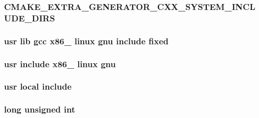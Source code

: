 \subsubsection[{\texorpdfstring{C\+M\+A\+K\+E\+\_\+\+E\+X\+T\+R\+A\+\_\+\+G\+E\+N\+E\+R\+A\+T\+O\+R\+\_\+\+C\+X\+X\+\_\+\+S\+Y\+S\+T\+E\+M\+\_\+\+I\+N\+C\+L\+U\+D\+E\+\_\+\+D\+I\+RS}{CMAKE_EXTRA_GENERATOR_CXX_SYSTEM_INCLUDE_DIRS}}]{ C\+M\+A\+K\+E\+\_\+\+E\+X\+T\+R\+A\+\_\+\+G\+E\+N\+E\+R\+A\+T\+O\+R\+\_\+\+C\+X\+X\+\_\+\+S\+Y\+S\+T\+E\+M\+\_\+\+I\+N\+C\+L\+U\+D\+E\+\_\+\+D\+I\+RS}\hypertarget{CMakeCache_8txt_ae84758144b16fbed96a3e6ea5781d3ad}{}\label{CMakeCache_8txt_ae84758144b16fbed96a3e6ea5781d3ad}
\subsubsection[{\texorpdfstring{fixed}{fixed}}]{\setlength{\rightskip}{0pt plus 5cm}usr lib gcc x86\+\_ linux {\bf gnu} {\bf include} fixed}\hypertarget{CMakeCache_8txt_a4a461500e9bc62f37d07d326b178ef08}{}\label{CMakeCache_8txt_a4a461500e9bc62f37d07d326b178ef08}
\subsubsection[{\texorpdfstring{gnu}{gnu}}]{\setlength{\rightskip}{0pt plus 5cm}usr {\bf include} x86\+\_ linux gnu}\hypertarget{CMakeCache_8txt_acb61b5fec09bcc7d3b88bf1109612ea6}{}\label{CMakeCache_8txt_acb61b5fec09bcc7d3b88bf1109612ea6}
\subsubsection[{\texorpdfstring{include}{include}}]{\setlength{\rightskip}{0pt plus 5cm}usr local include}\hypertarget{CMakeCache_8txt_a986ccfc90e04633694fe6cff5472be19}{}\label{CMakeCache_8txt_a986ccfc90e04633694fe6cff5472be19}
\subsubsection[{\texorpdfstring{int}{int}}]{\setlength{\rightskip}{0pt plus 5cm}long unsigned int}\hypertarget{CMakeCache_8txt_a79a3d8790b2588b09777910863574e09}{}\label{CMakeCache_8txt_a79a3d8790b2588b09777910863574e09}
